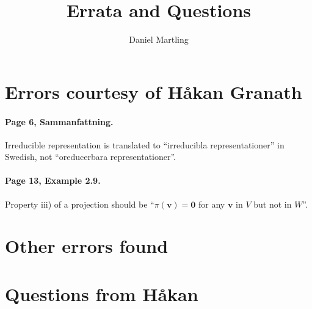 \documentclass[12pt,a4paper]{article}
\title{Errata and Questions}
\author{Daniel Martling}
\date{}
\theoremstyle{definition}
\theoremstyle{remark}
\numberwithin{equation}{section}
\newcommand{\1}{\mathbf{1}}
\newcommand{\0}{\mathbf{0}}
\newcommand{\vvec}{\mathbf{v}}
\begin{document}
	\maketitle
	
	\section*{Errors courtesy of Håkan Granath}
	
		\paragraph{Page 6, Sammanfattning.} Irreducible representation is translated to ``irreducibla representationer'' in Swedish, not ``oreducerbara representationer''.
		
		\paragraph{Page 13, Example 2.9.} Property iii) of a projection should be ``$\pi(\vvec) = \0$ for any $\vvec$ in $V$ but not in $W$''.
		
	\section*{Other errors found}
	
		\paragraph{}
		
	\section*{Questions from Håkan}
	
\end{document}
